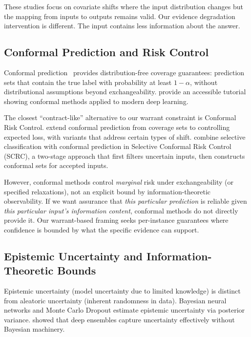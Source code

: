 \documentclass{article}
\begin{document}
These studies focus on covariate shifts where the input distribution changes but the mapping from inputs to outputs remains valid. Our evidence degradation intervention is different. The input contains less information about the answer.

\subsection{Conformal Prediction and Risk Control}

Conformal prediction~\citep{vovk2022algorithmic,shafer2008tutorial} provides distribution-free coverage guarantees: prediction sets that contain the true label with probability at least $1-\alpha$, without distributional assumptions beyond exchangeability. \citet{angelopoulos2021gentle} provide an accessible tutorial showing conformal methods applied to modern deep learning.

The closest ``contract-like'' alternative to our warrant constraint is Conformal Risk Control. \citet{angelopoulos2024conformal} extend conformal prediction from coverage sets to controlling expected loss, with variants that address certain types of shift. \citet{xu2025selectiveconformalriskcontrol} combine selective classification with conformal prediction in Selective Conformal Risk Control (SCRC), a two-stage approach that first filters uncertain inputs, then constructs conformal sets for accepted inputs.

However, conformal methods control \textit{marginal} risk under exchangeability (or specified relaxations), not an explicit bound by information-theoretic observability. If we want assurance that \textit{this particular prediction} is reliable given \textit{this particular input's information content}, conformal methods do not directly provide it. Our warrant-based framing seeks per-instance guarantees where confidence is bounded by what the specific evidence can support.

\subsection{Epistemic Uncertainty and Information-Theoretic Bounds}

Epistemic uncertainty (model uncertainty due to limited knowledge) is distinct from aleatoric uncertainty (inherent randomness in data). Bayesian neural networks and Monte Carlo Dropout \citep{gal2016dropout} estimate epistemic uncertainty via posterior variance. \citet{lakshminarayanan2017ensembles} showed that deep ensembles capture uncertainty effectively without Bayesian machinery.
\end{document}
